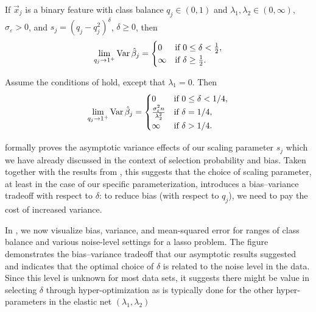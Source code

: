 \begin{theorem}
  \label{thm:classbalance-variance}
  If \(\vec{x}_j\) is a binary feature with class balance \(q_j \in (0, 1)\) and \(\lambda_1,\lambda_2 \in (0,\infty)\), \(\sigma_\varepsilon > 0\), and \(s_j = (q_j - q_j^2)^{\delta}\), \(\delta \geq 0\), then
  \[
    \lim_{q_j \rightarrow 1^+} \operatorname{Var} \hat{\beta}_j =
    \begin{cases}
      0      & \text{if } 0 \leq \delta < \frac{1}{2}, \\
      \infty & \text{if } \delta \geq \frac{1}{2}.
    \end{cases}
  \]
\end{theorem}

\begin{corollary}
  \label{cor:ridge-variance}
  Assume the conditions of  hold, except that \(\lambda_1 = 0\). Then
  \[
    \lim_{q_j \rightarrow 1^+} \operatorname{Var} \hat{\beta}_j =
    \begin{cases}
      0                                          & \text{if } 0 \leq \delta < 1/4, \\
      \frac{\sigma_\varepsilon^2 n}{\lambda_2^2} & \text{if } \delta = 1/4,        \\
      \infty                                     & \text{if } \delta > 1/4.
    \end{cases}
  \]
\end{corollary}

 formally proves the asymptotic variance effects of our
scaling parameter \(s_j\) which we have already discussed in the context of selection
probability and bias. Taken together with the results from ,
this suggests that the choice of scaling parameter, at least in the case of our specific
parameterization, introduces a bias--variance tradeoff with respect to \(\delta\): to
reduce bias (with respect to \(q_j\)), we need to pay the cost of increased variance.

In , we now visualize bias, variance, and mean-squared
error for ranges of class balance and various noise-level settings for a lasso problem. The
figure demonstrates the bias--variance tradeoff that our asymptotic results suggested and
indicates that the optimal choice of \(\delta\) is related to the noise level in the data.
Since this level is unknown for most data sets, it suggests there might be value in
selecting \(\delta\) through hyper-optimization as is typically done for the other
hyper-parameters in the elastic net \((\lambda_1, \lambda_2)\)

